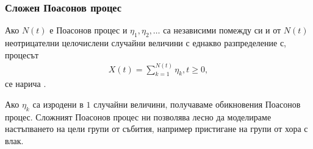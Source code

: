 \documentclass[numbers=endperiod, bibliography=totocnumbered]{scrartcl}
\begin{document}
\subsubsection{Сложен Поасонов процес}

\begin{definition}
  Ако \( N(t) \) е Поасонов процес и \( \eta_1, \eta_2, \ldots \) са независими помежду си и от \( N(t) \) неотрицателни целочислени случайни величини с еднакво разпределение с, процесът
  \begin{align*}
    X(t) = \sum_{k=1}^{N(t)} \eta_k, t \geq 0,
  \end{align*}
  се нарича .
\end{definition}

\begin{note}
  Ако \( \eta_k \) са изродени в \( 1 \) случайни величини, получаваме обикновения Поасонов процес. Сложният Поасонов процес ни позволява лесно да моделираме настъпването на цели групи от събития, например пристигане на групи от хора с влак.
\end{note}
\end{document}
